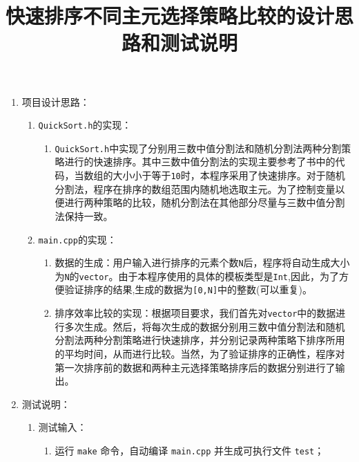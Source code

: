 \documentclass[a4paper,12pt]{article}
\begin{document}
\title{\hei 快速排序不同主元选择策略比较的设计思路和测试说明}


\maketitle


\begin{enumerate}
\item 项目设计思路：
\begin{enumerate}
    \item \verb|QuickSort.h|的实现：
    \begin{enumerate}
        \item \verb|QuickSort.h|中实现了分别用三数中值分割法和随机分割法两种分割策略进行的快速排序。其中三数中值分割法的实现主要参考了书中的代码，当数组的大小小于等于\verb|10|时，本程序采用了快速排序。对于随机分割法，程序在排序的数组范围内随机地选取主元。为了控制变量以便进行两种策略的比较，随机分割法在其他部分尽量与三数中值分割法保持一致。
    \end{enumerate}
    \item \verb|main.cpp|的实现：
    \begin{enumerate}
        \item {\hei 数据的生成}：用户输入进行排序的元素个数\verb|N|后，程序将自动生成大小为\verb|N|的\verb|vector|。由于本程序使用的具体的模板类型是\verb|Int|,因此，为了方便验证排序的结果,生成的数据为\verb|[0,N]|中的整数(可以重复)。
        \item {\hei 排序效率比较的实现}：根据项目要求，我们首先对\verb|vector|中的数据进行多次生成。然后，将每次生成的数据分别用三数中值分割法和随机分割法两种分割策略进行快速排序，并分别记录两种策略下排序所用的平均时间，从而进行比较。当然，为了验证排序的正确性，程序对第一次排序前的数据和两种主元选择策略排序后的数据分别进行了输出。
    \end{enumerate}
\end{enumerate}
\item 测试说明：
\begin{enumerate}
    \item 测试输入：
    \begin{enumerate}
        \item 运行 \verb|make| 命令，自动编译 \verb|main.cpp| 并生成可执行文件 \verb|test|；

\end{enumerate}
\end{enumerate}
\end{enumerate}
\end{document}
